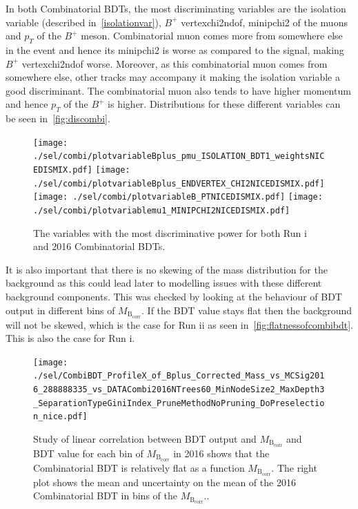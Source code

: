 In both Combinatorial BDTs, the most discriminating variables are the isolation variable (described in~\autoref{isolationvar}), $B^{+}$ \gls{vertexchi2ndof}, \gls{minipchi2} of the muons and $p_{T}$ of the $B^{+}$ meson. Combinatorial muon comes more from somewhere else in the event and hence its \gls{minipchi2} is worse as compared to the signal, making $B^{+}$ \gls{vertexchi2ndof} worse. Moreover, as this combinatorial muon comes from somewhere else, other tracks may accompany it making the isolation variable a good discriminant. The combinatorial muon also tends to have higher momentum and hence $p_{T}$ of the $B^{+}$ is higher. Distributions for these different variables can be seen in~\autoref{fig:discombi}. 


\begin{figure}[ht]
\centering
	\texttt{[image: ./sel/combi/plotvariableBplus\_pmu\_ISOLATION\_BDT1\_weightsNICEDISMIX.pdf]}%
	\texttt{[image: ./sel/combi/plotvariableBplus\_ENDVERTEX\_CHI2NICEDISMIX.pdf]}%
	\newline
	\texttt{[image: ./sel/combi/plotvariableB\_PTNICEDISMIX.pdf]}%
	\texttt{[image: ./sel/combi/plotvariablemu1\_MINIPCHI2NICEDISMIX.pdf]}%
	\caption{The variables with the most discriminative power for both Run \Rn{1} and 2016 Combinatorial BDTs.}
\label{fig:discombi}
\end{figure}


It is also important that there is no skewing of the mass distribution for the background as this could lead later to modelling issues with these different background components. This was checked by looking at the behaviour of BDT output in different bins of $M_{\mathrm{B_{corr}}}$. If the BDT value stays flat then the background will not be skewed, which is the case for Run \Rn{2} as seen in~\autoref{fig:flatnessofcombibdt}. This is also the case for Run \Rn{1}. 


\begin{figure}[ht]
\centering
	\texttt{[image: ./sel/CombiBDT\_ProfileX\_of\_Bplus\_Corrected\_Mass\_vs\_MCSig2016\_288888335\_vs\_DATACombi2016NTrees60\_MinNodeSize2\_MaxDepth3\_SeparationTypeGiniIndex\_PruneMethodNoPruning\_DoPreselection\_nice.pdf]}
	\caption{Study of linear correlation between BDT output and $M_{\mathrm{B_{corr}}}$ and BDT value for each bin of $M_{\mathrm{B_{corr}}}$ in 2016 shows that the Combinatorial BDT is relatively flat as a function $M_{\mathrm{B_{corr}}}$. The right plot shows the mean and uncertainty on the mean of the 2016 Combinatorial BDT in bins of the $M_{\mathrm{B_{corr}}}$..}
\label{fig:flatnessofcombibdt}
\end{figure}

